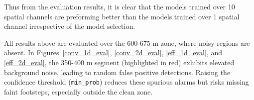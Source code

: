 Thus from the evaluation results, it is clear that the models trained over 10 spatial channels are preforming better than the models trained over 1 spatial channel irrespective of the model selection.

All results above are evaluated over the 600-675 m zone, where noisy regions are absent. In Figures~\ref{conv_1d_eval}, \ref{conv_2d_eval}, \ref{eff_1d_eval}, and \ref{eff_2d_eval}, the 350-400 m segment (highlighted in red) exhibits elevated background noise, leading to random false positive detections. Raising the confidence threshold (\texttt{min\_prob}) reduces these spurious alarms but risks missing faint footsteps, especially outside the clean zone.

